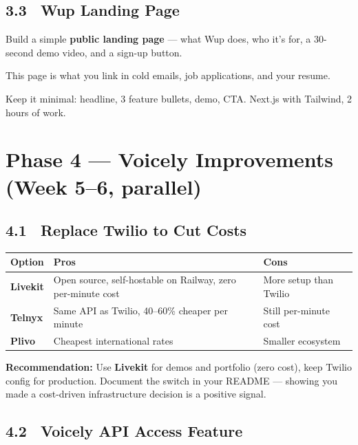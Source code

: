 \documentclass[11pt, a4paper]{article}
\DeclareRobustCommand{\badge}[2]{%
  \tikz[baseline=(n.base)]{
    \node[inner sep=3pt, rounded corners=3pt,
          fill=#1!15, text=#1!70!black,
          font=\fontsize{8}{8}\selectfont\bfseries] (n) {#2};
  }%
}
\DeclareRobustCommand{\high}{\badge{warning}{HIGH}}
\DeclareRobustCommand{\medium}{\badge{primary}{MEDIUM}}
\begin{document}
\subsection{3.3 \ Wup Landing Page \hfill \medium}

\begin{checklist}
  \item Build a simple \textbf{public landing page} — what Wup does, who it's for, a 30-second demo video, and a sign-up button.
  \item This page is what you link in cold emails, job applications, and your resume.
  \item Keep it minimal: headline, 3 feature bullets, demo, CTA. Next.js with Tailwind, 2 hours of work.
\end{checklist}

\section{Phase 4 — Voicely Improvements (Week 5–6, parallel)}

\subsection{4.1 \ Replace Twilio to Cut Costs \hfill \high}

\begin{tabularx}{\linewidth}{lXX}
\toprule
\textbf{Option} & \textbf{Pros} & \textbf{Cons} \\
\midrule
\textbf{Livekit} & Open source, self-hostable on Railway, zero per-minute cost & More setup than Twilio \\
\textbf{Telnyx} & Same API as Twilio, 40--60\% cheaper per minute & Still per-minute cost \\
\textbf{Plivo} & Cheapest international rates & Smaller ecosystem \\
\bottomrule
\end{tabularx}

\vspace{6pt}
\textbf{Recommendation:} Use \textbf{Livekit} for demos and portfolio (zero cost), keep Twilio config for production. Document the switch in your README — showing you made a cost-driven infrastructure decision is a positive signal.

\subsection{4.2 \ Voicely API Access Feature \hfill \high}
\end{document}
